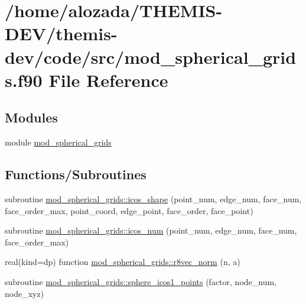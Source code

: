 \hypertarget{mod__spherical__grids_8f90}{}\section{/home/alozada/\+T\+H\+E\+M\+I\+S-\/\+D\+E\+V/themis-\/dev/code/src/mod\+\_\+spherical\+\_\+grids.f90 File Reference}
\label{mod__spherical__grids_8f90}
\subsection*{Modules}
\begin{DoxyCompactItemize}
\item 
module \hyperlink{namespacemod__spherical__grids}{mod\+\_\+spherical\+\_\+grids}
\end{DoxyCompactItemize}
\subsection*{Functions/\+Subroutines}
\begin{DoxyCompactItemize}
\item 
subroutine \hyperlink{namespacemod__spherical__grids_ac770a39945e60a262069f9f186819614}{mod\+\_\+spherical\+\_\+grids\+::icos\+\_\+shape} (point\+\_\+num, edge\+\_\+num, face\+\_\+num, face\+\_\+order\+\_\+max, point\+\_\+coord, edge\+\_\+point, face\+\_\+order, face\+\_\+point)
\item 
subroutine \hyperlink{namespacemod__spherical__grids_a98d8c41d6d666f6c3fe1dbadcf0dba89}{mod\+\_\+spherical\+\_\+grids\+::icos\+\_\+num} (point\+\_\+num, edge\+\_\+num, face\+\_\+num, face\+\_\+order\+\_\+max)
\item 
real(kind=dp) function \hyperlink{namespacemod__spherical__grids_adbe3eff686f6254a50a5afd75255c2c8}{mod\+\_\+spherical\+\_\+grids\+::r8vec\+\_\+norm} (n, a)
\item 
subroutine \hyperlink{namespacemod__spherical__grids_a58af853045eb54cbf3a8515e0f48b23b}{mod\+\_\+spherical\+\_\+grids\+::sphere\+\_\+icos1\+\_\+points} (factor, node\+\_\+num, node\+\_\+xyz)
\end{DoxyCompactItemize}
